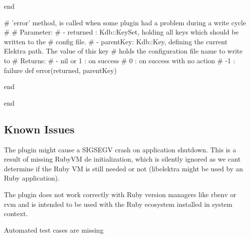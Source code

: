 \begin{DoxyCode}
  end


  # 'error' method, is called when some plugin had a problem during a write cycle
  #
  # Parameter:
  #  - returned : Kdb::KeySet, holding all keys which should be written to the
  #               config file.
  #  - parentKey: Kdb::Key, defining the current Elektra path. The value of this key
  #               holds the configuration file name to write to
  # Returns:
  #  - nil or 1 : on success
  #           0 : on success with no action
  #          -1 : failure
  def error(returned, parentKey)

  end

end
\end{DoxyCode}


\subsection*{Known Issues}


\begin{DoxyItemize}
\item The plugin might cause a S\+I\+G\+S\+E\+GV crash on application shutdown. This is a result of missing Ruby\+VM de initialization, which is silently ignored as we can\textquotesingle{}t determine if the Ruby VM is still needed or not (libelektra might be used by an Ruby application).
\item The plugin does not work correctly with Ruby version managers like {\ttfamily rbenv} or {\ttfamily rvm} and is intended to be used with the Ruby ecosystem installed in system context.
\item Automated test cases are missing 
\end{DoxyItemize}